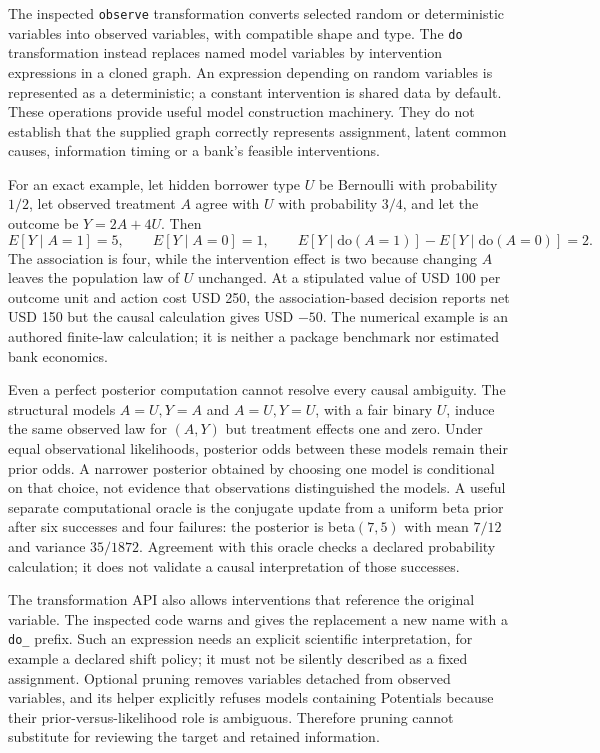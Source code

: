 The inspected \texttt{observe} transformation converts selected random or
deterministic variables into observed variables, with compatible shape and
type. The \texttt{do} transformation instead replaces named model variables
by intervention expressions in a cloned graph. An expression depending on
random variables is represented as a deterministic; a constant intervention
is shared data by default. These operations provide useful model construction
machinery. They do not establish that the supplied graph correctly represents
assignment, latent common causes, information timing or a bank's feasible
interventions.
\citep{exec23_pymc_sources}

For an exact example, let hidden borrower type $U$ be Bernoulli with probability
$1/2$, let observed treatment $A$ agree with $U$ with probability $3/4$, and let
the outcome be $Y=2A+4U$. Then
\[
 E[Y\mid A=1]=5,\qquad E[Y\mid A=0]=1,
 \qquad E[Y\mid\mathrm{do}(A=1)]-E[Y\mid\mathrm{do}(A=0)]=2.
\]
The association is four, while the intervention effect is two because changing
$A$ leaves the population law of $U$ unchanged. At a stipulated value of
USD 100 per outcome unit and action cost USD 250, the association-based decision
reports net USD 150 but the causal calculation gives USD $-50$. The numerical
example is an authored finite-law calculation; it is neither a package
benchmark nor estimated bank economics.
\citep{exec23_pymc_reference}

Even a perfect posterior computation cannot resolve every causal ambiguity.
The structural models $A=U,Y=A$ and $A=U,Y=U$, with a fair binary $U$, induce
the same observed law for $(A,Y)$ but treatment effects one and zero.
Under equal observational likelihoods, posterior odds between these models
remain their prior odds. A narrower posterior obtained by choosing one model
is conditional on that choice, not evidence that observations distinguished
the models. A useful separate computational oracle is the conjugate update
from a uniform beta prior after six successes and four failures: the posterior
is beta$(7,5)$ with mean $7/12$ and variance $35/1872$. Agreement with this
oracle checks a declared probability calculation; it does not validate a
causal interpretation of those successes.
\citep{exec23_pymc_reference}

The transformation API also allows interventions that reference the original
variable. The inspected code warns and gives the replacement a new name with
a \texttt{do\_} prefix. Such an expression needs an explicit scientific
interpretation, for example a declared shift policy; it must not be silently
described as a fixed assignment. Optional pruning removes variables detached
from observed variables, and its helper explicitly refuses models containing
Potentials because their prior-versus-likelihood role is ambiguous. Therefore
pruning cannot substitute for reviewing the target and retained information.
\citep{exec23_pymc_sources}

